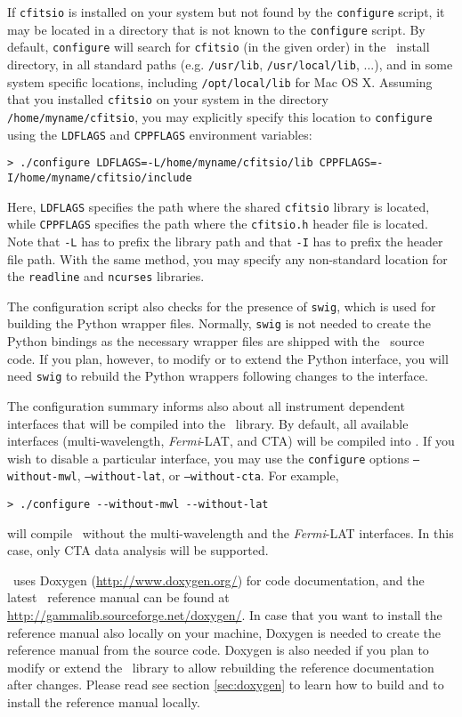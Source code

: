 \documentclass{article}[12pt,a4]
\begin{document}
If {\tt cfitsio} is installed on your system but not found by the {\tt configure} script, it may
be located in a directory that is not known to the {\tt configure} script.
By default, {\tt configure} will search for {\tt cfitsio} (in the given order) in the
\this\ install directory,
in all standard paths (e.g. {\tt /usr/lib}, {\tt /usr/local/lib}, ...), and
in some system specific locations, including {\tt /opt/local/lib} for Mac OS X.
Assuming that you installed {\tt cfitsio} on your system in the directory {\tt /home/myname/cfitsio},
you may explicitly specify this location to {\tt configure} using the {\tt LDFLAGS} and
{\tt CPPFLAGS} environment variables:
\begin{verbatim}
> ./configure LDFLAGS=-L/home/myname/cfitsio/lib CPPFLAGS=-I/home/myname/cfitsio/include
\end{verbatim}
Here, {\tt LDFLAGS} specifies the path where the shared {\tt cfitsio} library is located, while
{\tt CPPFLAGS} specifies the path where the {\tt cfitsio.h} header file is located.
Note that {\tt -L} has to prefix the library path and that {\tt -I} has to prefix the header
file path.
With the same method, you may specify any non-standard location for the {\tt readline} and 
{\tt ncurses} libraries.

The configuration script also checks for the presence of {\tt swig}, which is used for building
the Python wrapper files.
Normally, {\tt swig} is not needed to create the Python bindings as the necessary wrapper
files are shipped with the \this\ source code.
If you plan, however, to modify or to extend the Python interface, you will need {\tt swig} to rebuild
the Python wrappers following changes to the interface.

The configuration summary informs also about all instrument dependent interfaces that will be
compiled into the \this\ library.
By default, all available interfaces (multi-wavelength, {\em Fermi}-LAT, and CTA)
will be compiled into \this.
If you wish to disable a particular interface, you may use the {\tt configure} options
{\tt --without-mwl},
{\tt --without-lat}, or
{\tt --without-cta}.
For example,
\begin{verbatim}
> ./configure --without-mwl --without-lat
\end{verbatim}
will compile \this\ without the multi-wavelength and the {\em Fermi}-LAT interfaces.
In this case, only CTA data analysis will be supported.

\this\ uses Doxygen (\url{http://www.doxygen.org/}) for code documentation, and the latest
\this\ reference manual can be found at
\url{http://gammalib.sourceforge.net/doxygen/}.
In case that you want to install the reference manual also locally on your machine, Doxygen
is needed to create the reference manual from the source code.
Doxygen is also needed if you plan to modify or extend the \this\ library to allow rebuilding
the reference documentation after changes.
Please read see section \ref{sec:doxygen} to learn how to build and to install the reference
manual locally.
\end{document}
